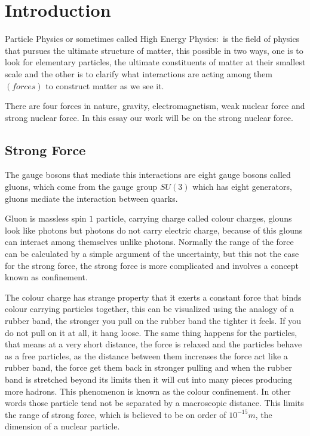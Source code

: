 \documentclass[12pt,a4paper]{article}
\begin{document}
\section{Introduction}
 Particle Physics or sometimes called High Energy Physics$:$ is the field of physics that pursues the ultimate structure of matter, this possible in two ways, one is to look for elementary particles, the ultimate constituents of matter at their smallest scale and the other is to clarify what interactions are acting among them $(forces)$ to construct matter as we see it.
 
There are four forces in nature, gravity, electromagnetism, weak nuclear force and strong nuclear force. In this essay our work will be on the strong nuclear force. 

\subsection{Strong Force}
The gauge bosons that mediate this interactions are eight gauge bosons called gluons, which come from the gauge group $SU(3)$ which has eight generators, gluons mediate the interaction between quarks.

Gluon is massless spin $1$ particle, carrying charge called colour charges, glouns look like photons but photons do not carry electric charge, because of this glouns can interact among themselves unlike photons.
Normally the range of the force can be calculated by a simple argument of the uncertainty, but this not the case for the strong force, the strong force is more complicated and involves a concept known as confinement.

The colour charge has strange property that it exerts a constant force that binds colour carrying particles together, this can be visualized using the analogy of a rubber band, the stronger you pull on the rubber band the tighter it feels. If you do not pull on it at all, it hang loose. The same thing happens for the particles,  that   means at a very short distance, the force is relaxed and the particles behave as a free particles, as the distance between them increases the force act like a rubber band, the force get them back in stronger pulling and when the rubber band is stretched beyond its limits then it will cut into many pieces producing more hadrons.  This phenomenon is known as the colour confinement. In other words those particle tend not be separated by a macroscopic distance.  
This limits the range of strong force, which is believed to be on order of $10^{-15}m$, the dimension of a nuclear particle.
\end{document}
